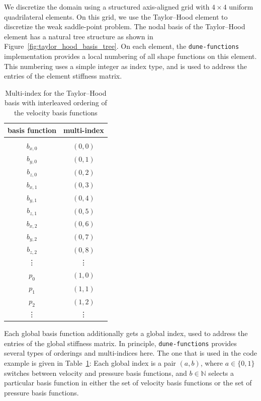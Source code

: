 \documentclass[a4paper,10pt,headings=normal,bibliography=totoc]{scrartcl}
\newcommand{\dunemodule}[1]{\texttt{#1}}
\begin{document}
We discretize the domain using a structured axis-aligned grid with $4 \times 4$ uniform quadrilateral elements.
On this grid, we use the Taylor--Hood element to discretize the weak saddle-point problem.  The nodal basis
of the Taylor--Hood element has a natural tree structure as shown in Figure~\ref{fig:taylor_hood_basis_tree}.
On each element, the \dunemodule{dune-functions} implementation provides a local numbering of all shape functions
on this element.  This numbering uses a simple integer as index type, and is used to address the entries of the
element stiffness matrix.

\begin{table}
 \begin{center}
 \begin{tabular}{c|c}
 basis function & multi-index \\
 \hline \\
  $b_{x,0}$  & $(0,0)$ \\
  $b_{y,0}$  & $(0,1)$ \\
  $b_{z,0}$  & $(0,2)$ \\
  $b_{x,1}$  & $(0,3)$ \\
  $b_{y,1}$  & $(0,4)$ \\
  $b_{z,1}$  & $(0,5)$ \\
  $b_{x,2}$  & $(0,6)$ \\
  $b_{y,2}$  & $(0,7)$ \\
  $b_{z,2}$  & $(0,8)$ \\
    \vdots   & \vdots  \\
  $p_0$      & $(1,0)$ \\
  $p_1$      & $(1,1)$ \\
  $p_2$      & $(1,2)$ \\
    \vdots   & \vdots
 \end{tabular}
 \end{center}
 \caption{Multi-index for the Taylor--Hood basis with interleaved ordering of the velocity basis functions}
 \label{tbl:th_multiindices_interleaved}
\end{table}

Each global basis function additionally gets a global index, used to address the entries of the global stiffness
matrix.  In principle, \dunemodule{dune-functions} provides several types of orderings and multi-indices here.
The one that is used in the code example is given  in Table~\ref{tbl:th_multiindices_interleaved}: Each global
index is a pair $(a,b)$, where $a \in \{0,1\}$ switches between velocity and pressure basis functions,
and $b \in \mathbb{N}$ selects a particular basis function in either the set of velocity basis functions
or the set of pressure basis functions.
\end{document}
